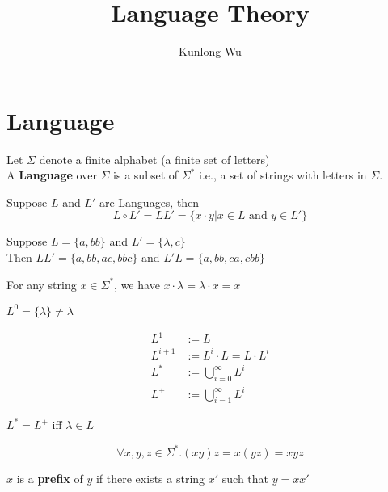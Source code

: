\documentclass{aq-notes}
\title{\bf Language Theory}
\author{Kunlong Wu}
\begin{document}
\section{Language}

    \begin{definition}[Language]
            Let $\Sigma$ denote a finite alphabet (a finite set of letters)\\
            A {\bf Language} over $\Sigma$ is a subset of $\Sigma^*$ i.e.,  a set of strings with letters in $\Sigma$.
    \end{definition}
    \begin{definition}
        Suppose $L$ and $L'$ are Languages, then
        \[L\circ L' = LL' = \{x\cdot y | x\in L \mbox{ and } y\in L'\}\]
    \end{definition}
    \begin{example}
        Suppose $L= \{a,bb\}$ and $L'=\{\lambda, c\}$\\
        Then $LL' =  \{a,bb,ac,bbc\}$ and $L'L = \{a,bb,ca,cbb\}$
    \end{example}
    \begin{definition}[\/$\lambda$\/]
        For any string $x \in \Sigma^*$, we have $x\cdot \lambda = \lambda \cdot x  = x$
    \end{definition}

    \begin{remark}
        $L^0 = \{\lambda\} \neq \lambda$
    \end{remark}

    \begin{definition}[ $L^i, L^*, L^+$ ]
        \begin{align*}
            L^1 &:= L\\
            L^{i+1} &:= L^i \cdot  L = L\cdot  L^i\\
            L^* &:= \bigcup_{i = 0}^\infty L^i\\
            L^+ &:= \bigcup_{i = 1}^\infty L^i
        \end{align*}
    \end{definition}
    \begin{remark}
        $L^* =L^+$ iff $\lambda\in L$
    \end{remark}
    \begin{theorem}[association]
        \[\forall x,y,z\in \Sigma^*. (xy)z = x(yz) = xyz\]
    \end{theorem}
    \begin{definition}[Prefix]
        $x$ is a {\bf prefix} of $y$ if there exists a string $x'$ such that $y = xx'$
    \end{definition}
\end{document}
